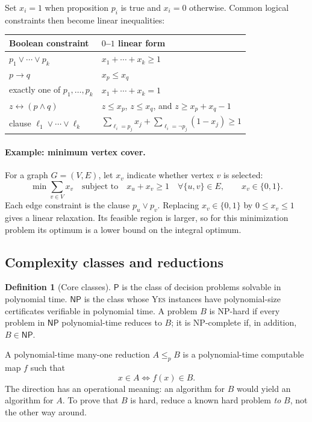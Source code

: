 \documentclass[10pt]{article}
\theoremstyle{definition}
\newtheorem{definition}{Definition}[section]
\newcommand{\YES}{\textsc{Yes}}
\newcommand{\NP}{\mathsf{NP}}
\newcommand{\PTIME}{\mathsf{P}}
\begin{document}
\begin{multicols*}{2}
Set $x_i=1$ when proposition $p_i$ is true and $x_i=0$ otherwise.  Common
logical constraints then become linear inequalities:

\begin{center}
\begin{tabular}{P{0.36\textwidth}P{0.43\textwidth}}
\toprule
Boolean constraint & $0$--$1$ linear form \\
\midrule
$p_1\lor\cdots\lor p_k$
  & $x_1+\cdots+x_k\ge1$ \\
$p\rightarrow q$
  & $x_p\le x_q$ \\
exactly one of $p_1,\ldots,p_k$
  & $x_1+\cdots+x_k=1$ \\
$z\leftrightarrow(p\land q)$
  & $z\le x_p$, $z\le x_q$, and $z\ge x_p+x_q-1$ \\
clause $\ell_1\lor\cdots\lor\ell_k$
  & $\sum_{\ell_i=p_j}x_j+\sum_{\ell_i=\neg p_j}(1-x_j)\ge1$ \\
\bottomrule
\end{tabular}
\end{center}

\paragraph{Example: minimum vertex cover.}
For a graph $G=(V,E)$, let $x_v$ indicate whether vertex $v$ is selected:
\[
  \min\sum_{v\in V}x_v
  \quad\text{subject to}\quad
  x_u+x_v\ge1\quad\forall\{u,v\}\in E,
  \qquad x_v\in\{0,1\}.
\]
Each edge constraint is the clause $p_u\lor p_v$.  Replacing
$x_v\in\{0,1\}$ by $0\le x_v\le1$ gives a linear relaxation.  Its feasible
region is larger, so for this minimization problem its optimum is a lower
bound on the integral optimum.

\subsection{Complexity classes and reductions}

\begin{definition}[Core classes]
$\PTIME$ is the class of decision problems solvable in polynomial time.
$\NP$ is the class whose \YES{} instances have polynomial-size certificates
verifiable in polynomial time.  A problem $B$ is NP-hard if every problem in
$\NP$ polynomial-time reduces to $B$; it is NP-complete if, in addition,
$B\in\NP$.
\end{definition}

A polynomial-time many-one reduction $A\le_p B$ is a polynomial-time
computable map $f$ such that
\[
  x\in A\iff f(x)\in B.
\]
The direction has an operational meaning: an algorithm for $B$ would yield an
algorithm for $A$.  To prove that $B$ is hard, reduce a known hard problem
\emph{to} $B$, not the other way around.


\end{multicols*}
\end{document}
